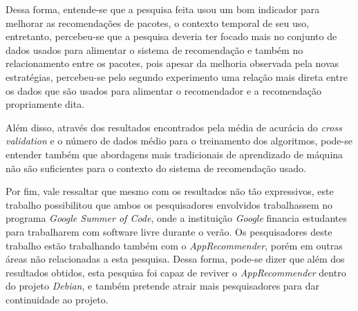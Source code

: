 Dessa forma, entende-se que a pesquisa feita usou um bom indicador para melhorar as
recomendações de pacotes, o contexto temporal de seu uso, entretanto,
percebeu-se que a pesquisa deveria ter focado mais no conjunto de dados usados
para alimentar o sistema de recomendação e também no relacionamento entre os
pacotes, pois apesar da melhoria observada pela novas estratégias, percebeu-se
pelo segundo experimento uma relação mais direta entre os dados que são usados
para alimentar o recomendador e a recomendação propriamente dita.

Além disso, através dos resultados encontrados pela média de acurácia do
\textit{cross validation} e o número de dados médio para o treinamento dos
algoritmos, pode-se entender também que abordagens mais tradicionais de
aprendizado de máquina não são suficientes para o contexto do sistema de
recomendação usado.

Por fim, vale ressaltar que mesmo com os resultados não tão expressivos, este
trabalho possibilitou que ambos os pesquisadores envolvidos trabalhassem no
programa \textit{Google Summer of Code}, onde a instituição \textit{Google}
financia estudantes para trabalharem com software livre durante o verão. Os
pesquisadores deste trabalho estão trabalhando também com o
\textit{AppRecommender}, porém em outras áreas não relacionadas a esta pesquisa.
Dessa forma, pode-se dizer que além dos resultados obtidos, esta pesquisa foi
capaz de reviver o \textit{AppRecommender} dentro do projeto \textit{Debian},
e também pretende atrair mais pesquisadores para dar continuidade ao projeto.
